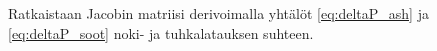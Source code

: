 Ratkaistaan Jacobin matriisi 
derivoimalla yhtälöt 
\eqref{eq:deltaP_ash} ja \eqref{eq:deltaP_soot}
noki- ja tuhkalatauksen suhteen. 



